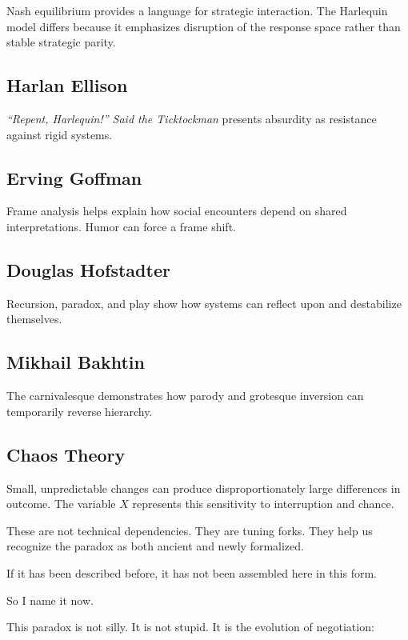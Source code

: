 \documentclass[11pt]{article}
\begin{document}
Nash equilibrium provides a language for strategic interaction. The Harlequin model differs because it emphasizes disruption of the response space rather than stable strategic parity.

\subsection{Harlan Ellison}

\emph{``Repent, Harlequin!'' Said the Ticktockman} presents absurdity as resistance against rigid systems.

\subsection{Erving Goffman}

Frame analysis helps explain how social encounters depend on shared interpretations. Humor can force a frame shift.

\subsection{Douglas Hofstadter}

Recursion, paradox, and play show how systems can reflect upon and destabilize themselves.

\subsection{Mikhail Bakhtin}

The carnivalesque demonstrates how parody and grotesque inversion can temporarily reverse hierarchy.

\subsection{Chaos Theory}

Small, unpredictable changes can produce disproportionately large differences in outcome. The variable $X$ represents this sensitivity to interruption and chance.

These are not technical dependencies. They are tuning forks. They help us recognize the paradox as both ancient and newly formalized.

If it has been described before, it has not been assembled here in this form.

So I name it now.

This paradox is not silly. It is not stupid. It is the evolution of negotiation:
\end{document}
